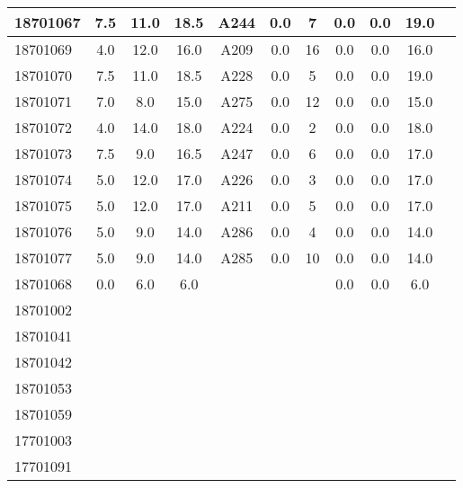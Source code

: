 \documentclass[12pt]{article}
\begin{document}
\begin{center}
\begin{small}
\begin{tabular}{|l|c|c|c|c|c|c|c|c|c|c|}
18701067 & 7.5 & 11.0 & 18.5 & A244 & 0.0 & 7 & 0.0 & 0.0 & 19.0\\ \hline 
18701069 & 4.0 & 12.0 & 16.0 & A209 & 0.0 & 16 & 0.0 & 0.0 & 16.0\\ \hline 
18701070 & 7.5 & 11.0 & 18.5 & A228 & 0.0 & 5 & 0.0 & 0.0 & 19.0\\ \hline 
18701071 & 7.0 & 8.0 & 15.0 & A275 & 0.0 & 12 & 0.0 & 0.0 & 15.0\\ \hline 
18701072 & 4.0 & 14.0 & 18.0 & A224 & 0.0 & 2 & 0.0 & 0.0 & 18.0\\ \hline 
18701073 & 7.5 & 9.0 & 16.5 & A247 & 0.0 & 6 & 0.0 & 0.0 & 17.0\\ \hline 
18701074 & 5.0 & 12.0 & 17.0 & A226 & 0.0 & 3 & 0.0 & 0.0 & 17.0\\ \hline 
18701075 & 5.0 & 12.0 & 17.0 & A211 & 0.0 & 5 & 0.0 & 0.0 & 17.0\\ \hline 
18701076 & 5.0 & 9.0 & 14.0 & A286 & 0.0 & 4 & 0.0 & 0.0 & 14.0\\ \hline 
18701077 & 5.0 & 9.0 & 14.0 & A285 & 0.0 & 10 & 0.0 & 0.0 & 14.0\\ \hline 
18701068 & 0.0 & 6.0 & 6.0 &  &  &  & 0.0 & 0.0 & 6.0\\ \hline 
18701002 &  &  &  &  &  &  &  &  & \\ \hline 
18701041 &  &  &  &  &  &  &  &  & \\ \hline 
18701042 &  &  &  &  &  &  &  &  & \\ \hline 
18701053 &  &  &  &  &  &  &  &  & \\ \hline 
18701059 &  &  &  &  &  &  &  &  & \\ \hline 
17701003 &  &  &  &  &  &  &  &  & \\ \hline 
17701091 &  &  &  &  &  &  &  &  & \\ \hline 
        \end{tabular}
            \end{small}
            \end{center}
  \centering
            
\end{document}
